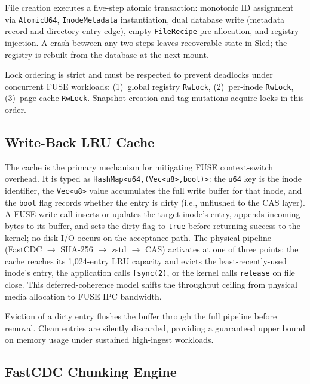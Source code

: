 \documentclass[conference]{IEEEtran}
\begin{document}
File creation executes a five-step atomic transaction: monotonic ID
assignment via \texttt{AtomicU64}, \texttt{InodeMetadata} instantiation,
dual database write (metadata record and directory-entry edge), empty
\texttt{FileRecipe} pre-allocation, and registry injection. A crash between
any two steps leaves recoverable state in Sled; the registry is rebuilt from
the database at the next mount.

Lock ordering is strict and must be respected to prevent deadlocks under
concurrent FUSE workloads: (1)~global registry \texttt{RwLock},
(2)~per-inode \texttt{RwLock}, (3)~page-cache \texttt{RwLock}. Snapshot
creation and tag mutations acquire locks in this order.

\subsection{Write-Back LRU Cache}

The cache is the primary mechanism for mitigating FUSE context-switch
overhead. It is typed as
\texttt{HashMap\textless{}u64,\;(Vec\textless{}u8\textgreater{},\;bool)\textgreater{}}:
the \texttt{u64} key is the inode identifier, the \texttt{Vec\textless{}u8\textgreater{}}
value accumulates the full write buffer for that inode, and the
\texttt{bool} flag records whether the entry is dirty (i.e., unflushed
to the CAS layer). A FUSE write call inserts or updates the target
inode's entry, appends incoming bytes to its buffer, and sets the dirty
flag to \texttt{true} before returning success to the kernel; no disk
I/O occurs on the acceptance path. The physical pipeline
(FastCDC $\to$ SHA-256 $\to$ zstd $\to$ CAS) activates at one of three
points: the cache reaches its 1{,}024-entry LRU capacity and evicts the
least-recently-used inode's entry, the application calls \texttt{fsync(2)},
or the kernel calls \texttt{release} on file close. This deferred-coherence
model shifts the throughput ceiling from physical media allocation to FUSE
IPC bandwidth.

Eviction of a dirty entry flushes the buffer through the full pipeline
before removal. Clean entries are silently discarded, providing a
guaranteed upper bound on memory usage under sustained high-ingest
workloads.

\subsection{FastCDC Chunking Engine}
\end{document}
